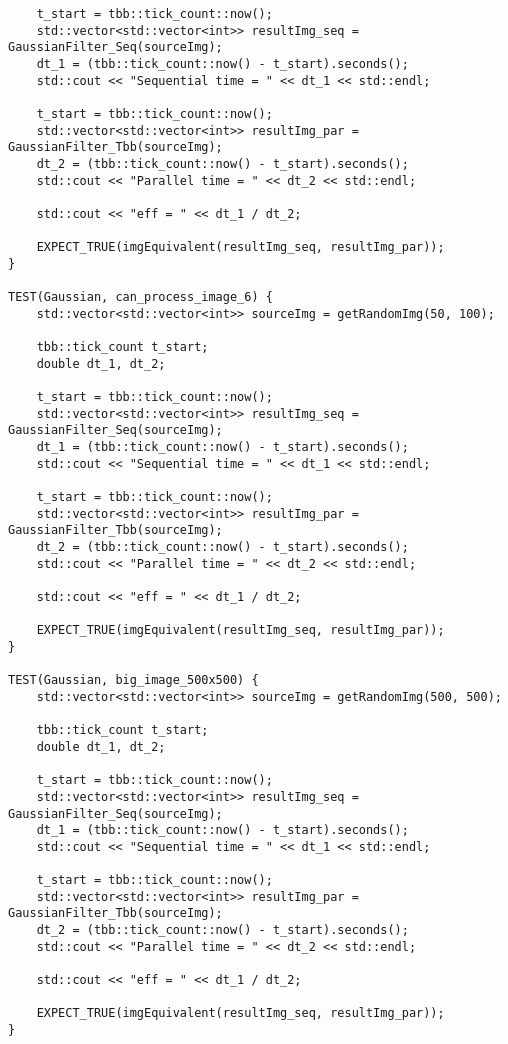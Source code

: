 \documentclass{report}
\begin{document}
\begin{lstlisting}
    t_start = tbb::tick_count::now();
    std::vector<std::vector<int>> resultImg_seq = GaussianFilter_Seq(sourceImg);
    dt_1 = (tbb::tick_count::now() - t_start).seconds();
    std::cout << "Sequential time = " << dt_1 << std::endl;

    t_start = tbb::tick_count::now();
    std::vector<std::vector<int>> resultImg_par = GaussianFilter_Tbb(sourceImg);
    dt_2 = (tbb::tick_count::now() - t_start).seconds();
    std::cout << "Parallel time = " << dt_2 << std::endl;

    std::cout << "eff = " << dt_1 / dt_2;

    EXPECT_TRUE(imgEquivalent(resultImg_seq, resultImg_par));
}

TEST(Gaussian, can_process_image_6) {
    std::vector<std::vector<int>> sourceImg = getRandomImg(50, 100);

    tbb::tick_count t_start;
    double dt_1, dt_2;

    t_start = tbb::tick_count::now();
    std::vector<std::vector<int>> resultImg_seq = GaussianFilter_Seq(sourceImg);
    dt_1 = (tbb::tick_count::now() - t_start).seconds();
    std::cout << "Sequential time = " << dt_1 << std::endl;

    t_start = tbb::tick_count::now();
    std::vector<std::vector<int>> resultImg_par = GaussianFilter_Tbb(sourceImg);
    dt_2 = (tbb::tick_count::now() - t_start).seconds();
    std::cout << "Parallel time = " << dt_2 << std::endl;

    std::cout << "eff = " << dt_1 / dt_2;

    EXPECT_TRUE(imgEquivalent(resultImg_seq, resultImg_par));
}

TEST(Gaussian, big_image_500x500) {
    std::vector<std::vector<int>> sourceImg = getRandomImg(500, 500);

    tbb::tick_count t_start;
    double dt_1, dt_2;

    t_start = tbb::tick_count::now();
    std::vector<std::vector<int>> resultImg_seq = GaussianFilter_Seq(sourceImg);
    dt_1 = (tbb::tick_count::now() - t_start).seconds();
    std::cout << "Sequential time = " << dt_1 << std::endl;

    t_start = tbb::tick_count::now();
    std::vector<std::vector<int>> resultImg_par = GaussianFilter_Tbb(sourceImg);
    dt_2 = (tbb::tick_count::now() - t_start).seconds();
    std::cout << "Parallel time = " << dt_2 << std::endl;

    std::cout << "eff = " << dt_1 / dt_2;

    EXPECT_TRUE(imgEquivalent(resultImg_seq, resultImg_par));
}


\end{lstlisting}
\end{document}
